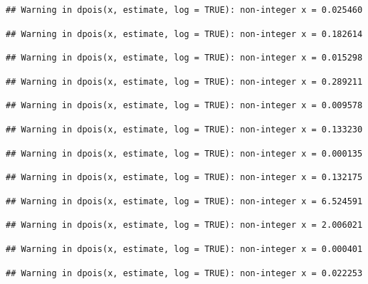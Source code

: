 \documentclass[]{article}
\begin{document}
\begin{verbatim}
## Warning in dpois(x, estimate, log = TRUE): non-integer x = 0.025460
\end{verbatim}

\begin{verbatim}
## Warning in dpois(x, estimate, log = TRUE): non-integer x = 0.182614
\end{verbatim}

\begin{verbatim}
## Warning in dpois(x, estimate, log = TRUE): non-integer x = 0.015298
\end{verbatim}

\begin{verbatim}
## Warning in dpois(x, estimate, log = TRUE): non-integer x = 0.289211
\end{verbatim}

\begin{verbatim}
## Warning in dpois(x, estimate, log = TRUE): non-integer x = 0.009578
\end{verbatim}

\begin{verbatim}
## Warning in dpois(x, estimate, log = TRUE): non-integer x = 0.133230
\end{verbatim}

\begin{verbatim}
## Warning in dpois(x, estimate, log = TRUE): non-integer x = 0.000135
\end{verbatim}

\begin{verbatim}
## Warning in dpois(x, estimate, log = TRUE): non-integer x = 0.132175
\end{verbatim}

\begin{verbatim}
## Warning in dpois(x, estimate, log = TRUE): non-integer x = 6.524591
\end{verbatim}

\begin{verbatim}
## Warning in dpois(x, estimate, log = TRUE): non-integer x = 2.006021
\end{verbatim}

\begin{verbatim}
## Warning in dpois(x, estimate, log = TRUE): non-integer x = 0.000401
\end{verbatim}

\begin{verbatim}
## Warning in dpois(x, estimate, log = TRUE): non-integer x = 0.022253
\end{verbatim}
\end{document}
